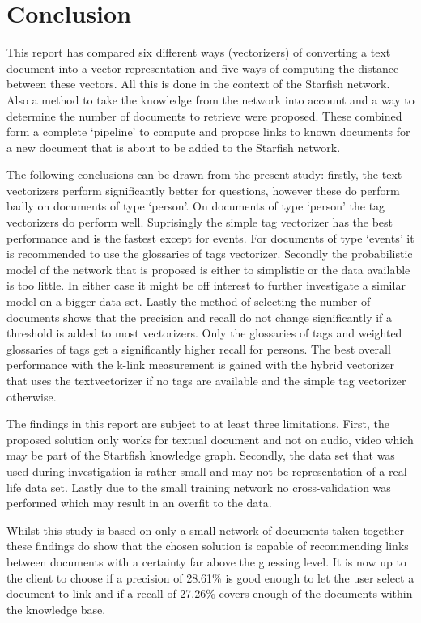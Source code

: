 \section{Conclusion}
This report has compared six different ways (vectorizers) of converting a text
document into a vector representation and five ways of computing the distance
between these vectors. All this is done in the context of the Starfish network.
Also a method to take the knowledge from the network into account and a way to
determine the number of documents to retrieve were proposed. These combined
form a complete `pipeline' to compute and propose links to known documents for
a new document that is about to be added to the Starfish network.

The following conclusions can be drawn from the present study: firstly, the
text vectorizers perform significantly better for questions, however these do
perform badly on documents of type `person'. On documents of type `person' the
tag vectorizers do perform well. Suprisingly the simple tag vectorizer has the
best performance and is the fastest except for events. For documents of type
`events' it is recommended to use the glossaries of tags vectorizer.  Secondly
the probabilistic model of the network that is proposed is either to simplistic
or the data available is too little. In either case it might be off interest to
further investigate a similar model on a bigger data set. Lastly the method
of selecting the number of documents shows that the precision and recall do
not change significantly if a threshold is added to most vectorizers. Only the
glossaries of tags and weighted glossaries of tags get a significantly higher
recall for persons. The best overall performance with the k-link measurement
is gained with the hybrid vectorizer that uses the textvectorizer if no tags are
available and the simple tag vectorizer otherwise. 

The findings in this report are subject to at least three limitations. First,
the proposed solution only works for textual document and not on audio, video
which may be part of the Startfish knowledge graph. Secondly, the data set
that was used during investigation is rather small and may not be representation
of a real life data set. Lastly due to the small training network no cross-validation
was performed which may result in an overfit to the data.

Whilst this study is based on only a small network of documents taken together
these findings do show that the chosen solution is capable of recommending
links between documents with a certainty far above the guessing level. It is
now up to the client to choose if a precision of 28.61\%
is good enough to let the user select a document to link and if a recall of 27.26\%
covers enough of the documents within the knowledge base. 



